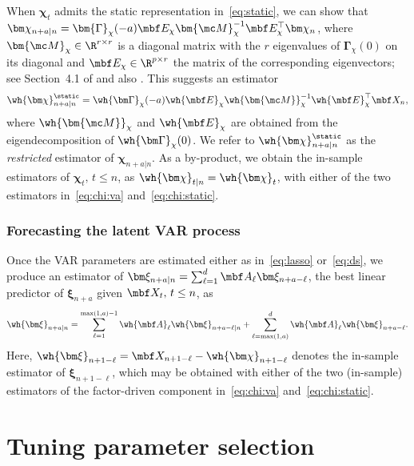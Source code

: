 When $\bm\chi_t$ admits the static representation in~\eqref{eq:static}, we can show that $\bm\chi_{n + a \vert n} = \bm{\Gamma}_\chi( - a) \mbf E_\chi \bm{\mc M}_\chi^{-1} \mbf E_\chi^\top \bm\chi_n$, where $\bm{\mc M}_\chi \in \R^{r \times r}$ is a diagonal matrix with the $r$ eigenvalues of $\bm\Gamma_\chi(0)$ on its diagonal and $\mbf E_\chi \in \R^{p \times r}$ the matrix of the corresponding eigenvectors; see Section~4.1 of \cite{barigozzi2022fnets} and also \cite{forni2005generalized}.
This suggests an estimator
\begin{align}
\label{eq:chi:static}
\wh{\bm\chi}^{\static}_{n + a \vert n} = \wh{\bm\Gamma}_\chi(-a) \wh{\mbf E}_\chi \wh{\bm{\mc M}}_\chi^{-1} \wh{\mbf E}_\chi^\top \mbf X_n,
\end{align}
where $\wh{\bm{\mc M}}_\chi$ and $\wh{\mbf E}_\chi$ are obtained from the eigendecomposition of $\wh{\bm\Gamma}_\chi(0)$.
We refer to $\wh{\bm\chi}^{\static}_{n + a \vert n}$ as the {\it restricted} estimator of $\bm\chi_{n + a \vert n}$.
As a by-product, we obtain the in-sample estimators of $\bm\chi_t, \, t \le n$, as $\wh{\bm\chi}_{t \vert n} = \wh{\bm\chi}_t$, with either of the two estimators in~\eqref{eq:chi:va} and~\eqref{eq:chi:static}.

\subsubsection{Forecasting the latent VAR process}
\label{sec:idio:pred}

Once the VAR parameters are estimated either as in~\eqref{eq:lasso} or~\eqref{eq:ds}, we produce an estimator of $\bm\xi_{n + a \vert n} = \sum_{\ell = 1}^{d} \mbf A_{\ell} \bm\xi_{n + a - \ell}$, the best linear predictor of $\bm\xi_{n + a}$ given $\mbf X_t, \, t \le n$, as
\begin{align}
\label{eq:idio:best:lin:pred}
\wh{\bm\xi}_{n + a \vert n} = \sum_{\ell = 1}^{\max(1, a) - 1} \wh{\mbf A}_{\ell} \wh{\bm\xi}_{n + a - \ell \vert n} + \sum_{\ell = \max(1, a)}^{d} \wh{\mbf A}_{\ell} \wh{\bm\xi}_{n + a - \ell}.
\end{align}
Here, $\wh{\bm\xi}_{n + 1 - \ell} = \mbf X_{n + 1 - \ell} - \wh{\bm\chi}_{n + 1 - \ell}$ denotes the in-sample estimator of $\bm\xi_{n + 1 - \ell}$, which may be obtained with either of the two (in-sample) estimators of the factor-driven component in~\eqref{eq:chi:va} and~\eqref{eq:chi:static}.

\section{Tuning parameter selection}
\label{sec:tuning}

